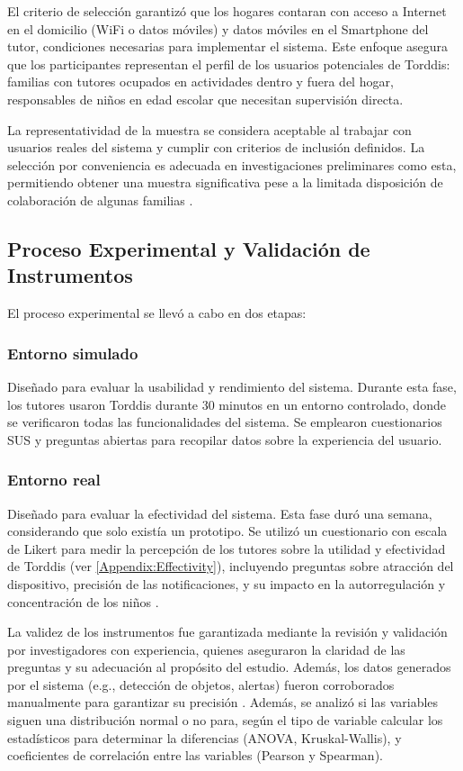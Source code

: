 \documentclass[a4paper,fleqn]{cas-sc}
\begin{document}
			El criterio de selección garantizó que los hogares contaran con acceso a Internet en el domicilio (WiFi o datos móviles) y datos móviles en el Smartphone del tutor, condiciones necesarias para implementar el sistema. Este enfoque asegura que los participantes representan el perfil de los usuarios potenciales de Torddis: familias con tutores ocupados en actividades dentro y fuera del hogar, responsables de niños en edad escolar que necesitan supervisión directa.
			
			La representatividad de la muestra se considera aceptable al trabajar con usuarios reales del sistema y cumplir con criterios de inclusión definidos. La selección por conveniencia es adecuada en investigaciones preliminares como esta, permitiendo obtener una muestra significativa pese a la limitada disposición de colaboración de algunas familias \citep{DiPietro2025Meta}.
		
		\subsection{Proceso Experimental y Validación de Instrumentos}
			El proceso experimental se llevó a cabo en dos etapas:
		
			\subsubsection{Entorno simulado}
				Diseñado para evaluar la usabilidad y rendimiento del sistema. Durante esta fase, los tutores usaron Torddis durante 30 minutos en un entorno controlado, donde se verificaron todas las funcionalidades del sistema. Se emplearon cuestionarios SUS y preguntas abiertas para recopilar datos sobre la experiencia del usuario.
			
			\subsubsection{Entorno real}
				Diseñado para evaluar la efectividad del sistema. Esta fase duró una semana, considerando que solo existía un prototipo. Se utilizó un cuestionario con escala de Likert para medir la percepción de los tutores sobre la utilidad y efectividad de Torddis (ver \ref{Appendix:Effectivity}), incluyendo preguntas sobre atracción del dispositivo, precisión de las notificaciones, y su impacto en la autorregulación y concentración de los niños \citep{Ackermans2025Young}.
			
				La validez de los instrumentos fue garantizada mediante la revisión y validación por investigadores con experiencia, quienes aseguraron la claridad de las preguntas y su adecuación al propósito del estudio. Además, los datos generados por el sistema (e.g., detección de objetos, alertas) fueron corroborados manualmente para garantizar su precisión \citep{Wang2025Development}. Además, se analizó si las variables siguen una distribución normal o no para, según el tipo de variable calcular los estadísticos para determinar la diferencias (ANOVA, Kruskal-Wallis), y coeficientes de correlación entre las variables (Pearson y Spearman).
		
\end{document}
